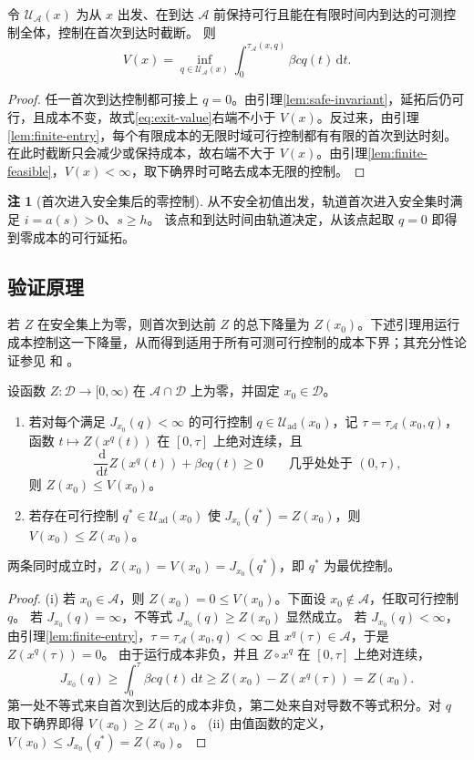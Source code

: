 \documentclass[lang=cn,a4paper,newtx]{elegantpaper}
\theoremstyle{plain}
\theoremstyle{definition}
\newtheorem{paperremark}[theorem]{注}
\newcommand{\Acal}{\mathcal A}
\newcommand{\Dcal}{\mathcal D}
\newcommand{\Uad}{\mathcal U_{\mathrm{ad}}}
\newcommand{\dd}{\,\mathrm d}
\begin{document}
\begin{proposition}[无穷时域与首次到达问题等价]
\label{prop:exit-equivalence}
令 $\mathcal U_{\Acal}(x)$ 为从 $x$ 出发、在到达 $\Acal$ 前保持可行且能在有限时间内到达的可测控制全体，控制在首次到达时截断。
则
\begin{equation}
V(x)=\inf_{q\in\mathcal U_{\Acal}(x)}
\int_0^{\tau_{\Acal}(x,q)}\beta cq(t)\dd t.
\label{eq:exit-value}
\end{equation}
\end{proposition}
\begin{proof}
任一首次到达控制都可接上 $q=0$。由引理\ref{lem:safe-invariant}，延拓后仍可行，且成本不变，故式\eqref{eq:exit-value}右端不小于 $V(x)$。反过来，由引理\ref{lem:finite-entry}，每个有限成本的无限时域可行控制都有有限的首次到达时刻。在此时截断只会减少或保持成本，故右端不大于 $V(x)$。由引理\ref{lem:finite-feasible}，$V(x)<\infty$，取下确界时可略去成本无限的控制。
\end{proof}
\begin{paperremark}[首次进入安全集后的零控制]
从不安全初值出发，轨道首次进入安全集时满足 $i=a(s)>0$、$s\ge h$。
该点和到达时间由轨道决定，从该点起取 $q=0$ 即得到零成本的可行延拓。
\end{paperremark}

\subsection{验证原理}
\label{sec:verification-principle}
若 $Z$ 在安全集上为零，则首次到达前 $Z$ 的总下降量为 $Z(x_0)$。下述引理用运行成本控制这一下降量，从而得到适用于所有可测可行控制的成本下界；其充分性论证参见 \textcite[附录A.1]{MicloSpiroWeibull2022} 和 \textcite[\S5.1.4]{Liberzon2012}。

\begin{lemma}[验证原理]
\label{lem:verification-principle}
设函数 $Z:\Dcal\to[0,\infty)$ 在 $\Acal\cap\Dcal$ 上为零，并固定 $x_0\in\Dcal$。
\begin{enumerate}
\item[(i)] 若对每个满足 $J_{x_0}(q)<\infty$ 的可行控制 $q\in\Uad(x_0)$，记 $\tau=\tau_{\Acal}(x_0,q)$，
函数 $t\mapsto Z(x^q(t))$ 在 $[0,\tau]$ 上绝对连续，且
\[
\frac{\dd}{\dd t}Z(x^q(t))+\beta cq(t)\ge0\qquad\text{几乎处处于 }(0,\tau),
\]
则 $Z(x_0)\le V(x_0)$。
\item[(ii)] 若存在可行控制 $q^*\in\Uad(x_0)$ 使 $J_{x_0}(q^*)=Z(x_0)$，则 $V(x_0)\le Z(x_0)$。
\end{enumerate}
两条同时成立时，$Z(x_0)=V(x_0)=J_{x_0}(q^*)$，即 $q^*$ 为最优控制。
\end{lemma}
\begin{proof}
(i) 若 $x_0\in\Acal$，则 $Z(x_0)=0\le V(x_0)$。下面设 $x_0\notin\Acal$，任取可行控制 $q$。
若 $J_{x_0}(q)=\infty$，不等式 $J_{x_0}(q)\ge Z(x_0)$ 显然成立。
若 $J_{x_0}(q)<\infty$，由引理\ref{lem:finite-entry}，$\tau=\tau_{\Acal}(x_0,q)<\infty$ 且 $x^q(\tau)\in\Acal$，于是 $Z(x^q(\tau))=0$。
由于运行成本非负，并且 $Z\circ x^q$ 在 $[0,\tau]$ 上绝对连续，
\[
J_{x_0}(q)\ge\int_0^{\tau}\beta cq(t)\dd t
\ge Z(x_0)-Z(x^q(\tau))=Z(x_0).
\]
第一处不等式来自首次到达后的成本非负，第二处来自对导数不等式积分。对 $q$ 取下确界即得 $V(x_0)\ge Z(x_0)$。
(ii) 由值函数的定义，$V(x_0)\le J_{x_0}(q^*)=Z(x_0)$。
\end{proof}
\end{document}
